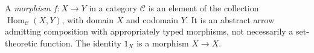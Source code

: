 
A \emph{morphism} $f:X\to Y$ in a category $\mathcal C$ is an element of the collection $\operatorname{Hom}_{\mathcal C}(X,Y)$, with domain $X$ and codomain $Y$. It is an abstract arrow admitting composition with appropriately typed morphisms, not necessarily a set-theoretic function. The identity $1_X$ is a morphism $X\to X$.

